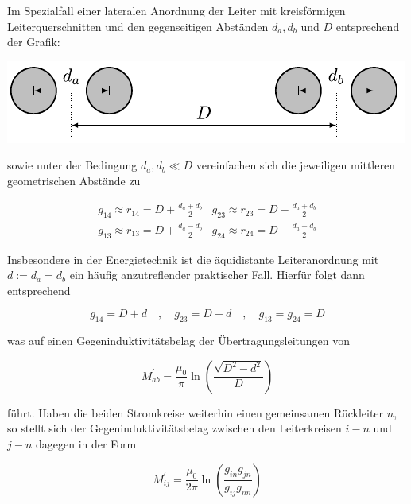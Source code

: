 Im Spezialfall einer lateralen Anordnung der Leiter mit kreisförmigen Leiterquerschnitten und den gegenseitigen Abständen $d_{a}, d_{b}$ und $D$ entsprechend der Grafik:

\begin{center}
	\includegraphics{res/LT10}
\end{center}

sowie unter der Bedingung $d_{a}, d_{b} \ll D$ vereinfachen sich die jeweiligen mittleren geometrischen Abstände zu

\begin{equation}
	\begin{array}{ll}
		g_{14} \approx r_{14}=D+\frac{d_{a}+d_{b}}{2} & g_{23} \approx r_{23}=D-\frac{d_{a}+d_{b}}{2} \\
		g_{13} \approx r_{13}=D+\frac{d_{a}-d_{b}}{2} & g_{24} \approx r_{24}=D-\frac{d_{a}-d_{b}}{2} 
	\end{array}
\end{equation}

Insbesondere in der Energietechnik ist die äquidistante Leiteranordnung mit $d:=d_{a}=d_{b}$ ein häufig anzutreflender praktischer Fall. Hierfür folgt dann entsprechend


\begin{equation}
	g_{14}=D+d \quad, \quad g_{23}=D-d \quad, \quad g_{13}=g_{24}=D 
\end{equation}


was auf einen Gegeninduktivitätsbelag der Übertragungsleitungen von


\begin{equation}
	M_{a b}^{\prime}=\frac{\mu_{0}}{\pi} \ln \left(\frac{\sqrt{D^{2}-d^{2}}}{D}\right) 
\end{equation}


führt. Haben die beiden Stromkreise weiterhin einen gemeinsamen Rückleiter $n$, so stellt sich der Gegeninduktivitätsbelag zwischen den Leiterkreisen $i-n$ und $j-n$ dagegen in der Form


\begin{equation}
	M_{i j}^{\prime}=\frac{\mu_{0}}{2 \pi} \ln \left(\frac{g_{i n} g_{j n}}{g_{i j} g_{n n}}\right) 
\end{equation}



